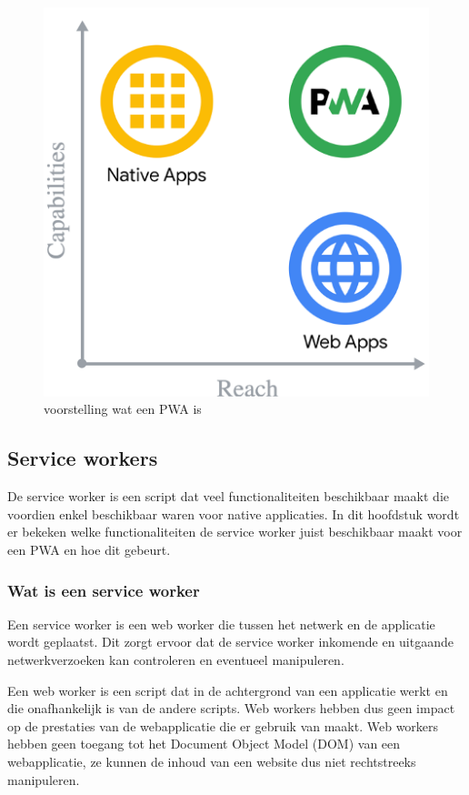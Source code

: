 \begin{figure}[!htb]
	\centering
	\includegraphics{./img/WatIsEenPwa.png}
	\caption{voorstelling wat een PWA is \autocite{Richard2020}}
	\label{fig:watIsEenPWA}
\end{figure}


\subsection{Service workers}

	De service worker is een script dat veel functionaliteiten beschikbaar maakt die voordien enkel beschikbaar waren voor native applicaties. In dit hoofdstuk wordt er bekeken welke functionaliteiten de service worker juist beschikbaar maakt voor een PWA en hoe dit gebeurt. 
	
	
	
	\subsubsection{Wat is een service worker}
	\label{ch: Wat is een servcie worker}
	
		Een service worker is een web worker die tussen het netwerk en de applicatie wordt geplaatst. Dit zorgt ervoor dat de service worker inkomende en uitgaande netwerkverzoeken kan controleren en eventueel manipuleren.
		\autocite{Mozilla2020}
		
		Een web worker is een script dat in de achtergrond van een applicatie werkt en die onafhankelijk is van de andere scripts. Web workers hebben dus geen impact op de prestaties van de webapplicatie die er gebruik van maakt.  Web workers hebben geen toegang tot het Document Object Model (DOM) van een webapplicatie, ze kunnen de inhoud van een website dus niet rechtstreeks manipuleren.
		\autocite{Verdu2015}
		\autocite{Hiltunen2018}
		
